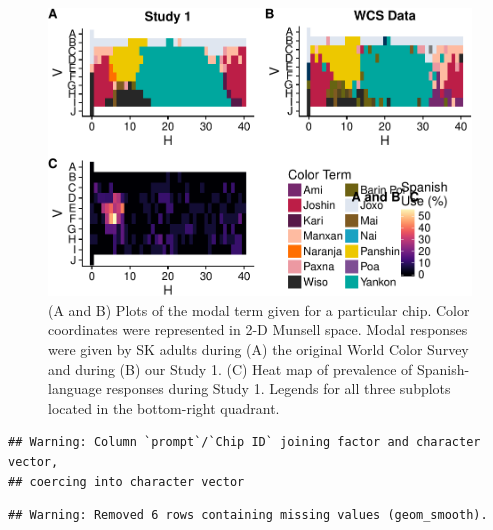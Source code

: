 \documentclass[man]{apa6}
\theoremstyle{definition}
\theoremstyle{definition}
\theoremstyle{definition}
\theoremstyle{remark}
\begin{document}
\begin{figure}
\centering
\includegraphics{amazon_color_files/figure-latex/adultfigure-1.pdf}
\caption{\label{fig:adultfigure}(A and B) Plots of the modal term given for
a particular chip. Color coordinates were represented in 2-D Munsell
space. Modal responses were given by SK adults during (A) the original
World Color Survey and during (B) our Study 1. (C) Heat map of
prevalence of Spanish-language responses during Study 1. Legends for all
three subplots located in the bottom-right quadrant.}
\end{figure}

\begin{verbatim}
## Warning: Column `prompt`/`Chip ID` joining factor and character vector,
## coercing into character vector
\end{verbatim}

\begin{verbatim}
## Warning: Removed 6 rows containing missing values (geom_smooth).
\end{verbatim}
\end{document}
